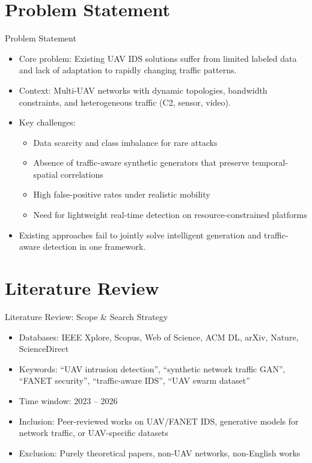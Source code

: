 \documentclass[10pt]{beamer}
\begin{document}
\section{Problem Statement}
\begin{frame}{Problem Statement}
    \begin{itemize}
        \item Core problem: Existing UAV IDS solutions suffer from limited labeled data and lack of adaptation to rapidly changing traffic patterns.
        \item Context: Multi-UAV networks with dynamic topologies, bandwidth constraints, and heterogeneous traffic (C2, sensor, video).
        \item Key challenges:
        \begin{itemize}
            \item Data scarcity and class imbalance for rare attacks
            \item Absence of traffic-aware synthetic generators that preserve temporal-spatial correlations
            \item High false-positive rates under realistic mobility
            \item Need for lightweight real-time detection on resource-constrained platforms
        \end{itemize}
        \item Existing approaches fail to jointly solve intelligent generation and traffic-aware detection in one framework.
    \end{itemize}
\end{frame}

\section{Literature Review}
\begin{frame}{Literature Review: Scope \& Search Strategy}
    \begin{itemize}
        \item Databases: IEEE Xplore, Scopus, Web of Science, ACM DL, arXiv, Nature, ScienceDirect
        \item Keywords: ``UAV intrusion detection'', ``synthetic network traffic GAN'', ``FANET security'', ``traffic-aware IDS'', ``UAV swarm dataset''
        \item Time window: 2023 – 2026
        \item Inclusion: Peer-reviewed works on UAV/FANET IDS, generative models for network traffic, or UAV-specific datasets
        \item Exclusion: Purely theoretical papers, non-UAV networks, non-English works
    \end{itemize}
\end{frame}
\end{document}
